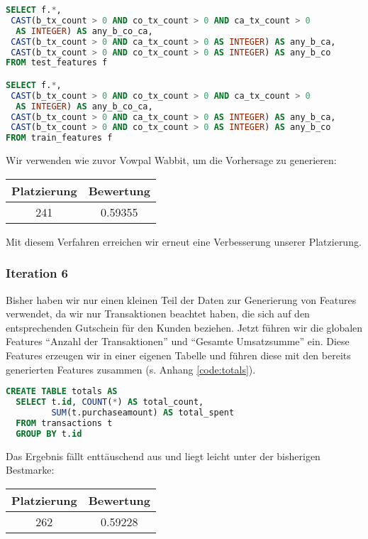 \begin{lstlisting}[language=SQL]
SELECT f.*, 
 CAST(b_tx_count > 0 AND co_tx_count > 0 AND ca_tx_count > 0 
  AS INTEGER) AS any_b_co_ca,
 CAST(b_tx_count > 0 AND ca_tx_count > 0 AS INTEGER) AS any_b_ca,
 CAST(b_tx_count > 0 AND co_tx_count > 0 AS INTEGER) AS any_b_co
FROM test_features f

SELECT f.*, 
 CAST(b_tx_count > 0 AND co_tx_count > 0 AND ca_tx_count > 0 
  AS INTEGER) AS any_b_co_ca,
 CAST(b_tx_count > 0 AND ca_tx_count > 0 AS INTEGER) AS any_b_ca,
 CAST(b_tx_count > 0 AND co_tx_count > 0 AS INTEGER) AS any_b_co
FROM train_features f
\end{lstlisting}

Wir verwenden wie zuvor Vowpal Wabbit, um die Vorhersage zu generieren:

\begin{tabular}{|c|c|}
	\hline \textbf{Platzierung} & \textbf{Bewertung} \\ 
	\hline 241 & 0.59355  \\ 
	\hline 
\end{tabular}

Mit diesem Verfahren erreichen wir erneut eine Verbesserung unserer Platzierung.

\subsubsection{Iteration 6}
Bisher haben wir nur einen kleinen Teil der Daten zur Generierung von Features verwendet,
da wir nur Transaktionen beachtet haben, die sich auf den entsprechenden Gutschein für 
den Kunden beziehen. 
Jetzt führen wir die globalen Features "`Anzahl der Transaktionen"' und "`Gesamte Umsatzsumme"' ein. Diese Features erzeugen wir in einer eigenen Tabelle und führen diese mit den bereits generierten Features zusammen (s. Anhang \ref{code:totals}).

\newpage

\begin{lstlisting}[language=SQL]
CREATE TABLE totals AS
  SELECT t.id, COUNT(*) AS total_count, 
         SUM(t.purchaseamount) AS total_spent
  FROM transactions t
  GROUP BY t.id
\end{lstlisting}

Das Ergebnis fällt enttäuschend aus und liegt leicht unter der bisherigen Bestmarke:

\begin{tabular}{|c|c|}
	\hline \textbf{Platzierung} & \textbf{Bewertung} \\ 
	\hline 262 & 0.59228  \\ 
	\hline 
\end{tabular}

